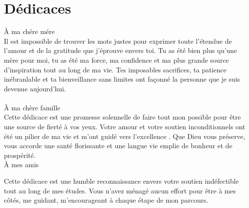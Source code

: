 \chapter*{Dédicaces}
\it \Large

 {À ma chére mére} 
\\Il est impossible de trouver les mots justes pour exprimer toute l'étendue de l'amour et de la gratitude que j'éprouve envers toi. Tu as été bien plus qu'une mère pour moi, tu as été ma force, ma confidence et ma plus grande source d'inspiration tout au long de ma vie. Tes imposables sacrifices, ta patience inébranlable et ta bienveillance sans limites ont façonné la personne que je suis devenue aujourd'hui.\\
\\
À  ma chère famille \\


Cette dédicace est une promesse solennelle de faire tout mon possible pour être une source de fierté à vos yeux. Votre amour et votre soutien inconditionnels ont été un pilier de ma vie et m'ont guidé vers l'excellence . Que Dieu vous préserve, vous accorde une santé florissante et une langue vie emplie de bonheur et de prospérité.
\\


À  mes amis


Cette dédicace est une humble reconnaissance envers votre soutien indéfectible tout au long de mes études. Vous n'avez ménagé aucun effort pour être à mes côtés, me guidant, m'encourageant à chaque étape de mon parcours.